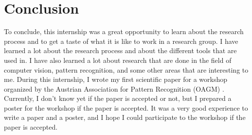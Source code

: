\chapter{Conclusion}

To conclude, this internship was a great opportunity to learn about the research process 
and to get a taste of what it is like to work in a research group. I have learned a lot 
about the research process and about the different tools that are used in. I have also 
learned a lot about research that are done in the field of computer vision, pattern 
recognition, and some other areas that are interesting to me. During this internship,
I wrote my first scientific paper for a workshop organized by the Austrian Association 
for Pattern Recognition (OAGM) \cite{OAGM}. Currently, I don't know yet if the paper
is accepted or not, but I prepared a poster for the workshop if the paper is accepted.
It was a very good experience to write a paper and a poster, and I hope I could
participate to the workshop if the paper is accepted.
